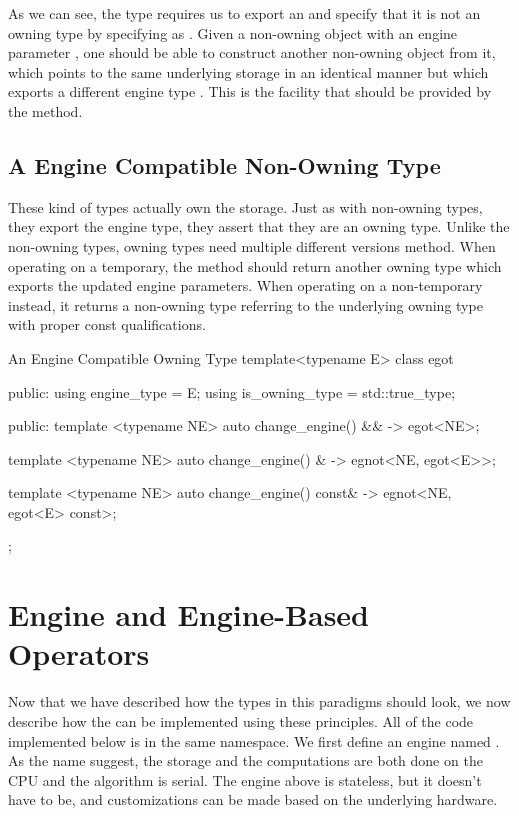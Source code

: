 \documentclass[oneside,11pt,a4paper]{jbarticle}
\begin{document}
As we can see, the type requires us to export an  and
specify that it is not an owning type by specifying 
as . Given a non-owning object with an engine
parameter , one should be able to construct another non-owning
object from it, which points to the same underlying storage in an identical
manner but which exports a different engine type . This is the
facility that should be provided by the  method.

\subsection{A Engine Compatible Non-Owning Type}
These kind of types actually own the storage. Just as with non-owning types,
they export the engine type, they assert that they are an owning type. Unlike
the non-owning types, owning types need multiple different versions
 method. When operating on a temporary, the method
should return another owning type which exports the updated engine parameters.
When operating on a non-temporary instead, it returns a non-owning type
referring to the underlying owning type with proper const qualifications.

\begin{codecpp}{An Engine Compatible Owning Type}
  template<typename E>
  class egot {
  public:
    using engine_type = E;
    using is_owning_type = std::true_type;

  public:
    template <typename NE>
    auto change_engine() && -> egot<NE>;

    template <typename NE>
    auto change_engine() & -> egnot<NE, egot<E>>;

    template <typename NE>
    auto change_engine() const& -> egnot<NE, egot<E> const>;
  };
\end{codecpp}

\section{Engine and Engine-Based Operators}

Now that we have described how the types in this paradigms should look, we now
describe how the  can be implemented using these
principles. All of the code implemented below is in the same namespace.  We
first define an engine named . As the name
suggest, the storage and the computations are both done on the CPU and the
algorithm is serial.  The engine above is stateless, but it doesn't have to be,
and customizations can be made based on the underlying hardware.
\end{document}
